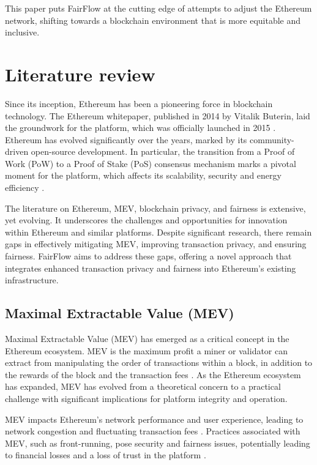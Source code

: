 \documentclass{article}
\begin{document}
This paper puts FairFlow at the cutting edge of attempts to adjust the Ethereum network, shifting towards a blockchain environment that is more equitable and inclusive.

\section{Literature review}

Since its inception, Ethereum has been a pioneering force in blockchain technology. The Ethereum whitepaper, published in 2014 by Vitalik Buterin, laid the groundwork for the platform, which was officially launched in 2015 \citep{buterin2014ethereum}. Ethereum has evolved significantly over the years, marked by its community-driven open-source development. In particular, the transition from a Proof of Work (PoW) to a Proof of Stake (PoS) consensus mechanism marks a pivotal moment for the platform, which affects its scalability, security and energy efficiency \citep{buterin2020ethereum2}.

The literature on Ethereum, MEV, blockchain privacy, and fairness is extensive, yet evolving. It underscores the challenges and opportunities for innovation within Ethereum and similar platforms. Despite significant research, there remain gaps in effectively mitigating MEV, improving transaction privacy, and ensuring fairness. FairFlow aims to address these gaps, offering a novel approach that integrates enhanced transaction privacy and fairness into Ethereum's existing infrastructure.

\subsection{Maximal Extractable Value (MEV)}

Maximal Extractable Value (MEV) has emerged as a critical concept in the Ethereum ecosystem. MEV is the maximum profit a miner or validator can extract from manipulating the order of transactions within a block, in addition to the rewards of the block and the transaction fees \citep{daian2019flash}. As the Ethereum ecosystem has expanded, MEV has evolved from a theoretical concern to a practical challenge with significant implications for platform integrity and operation.

MEV impacts Ethereum's network performance and user experience, leading to network congestion and fluctuating transaction fees \citep{qin2020quantifying}. Practices associated with MEV, such as front-running, pose security and fairness issues, potentially leading to financial losses and a loss of trust in the platform \citep{eskandari2019bitcoinkey}.
\end{document}
